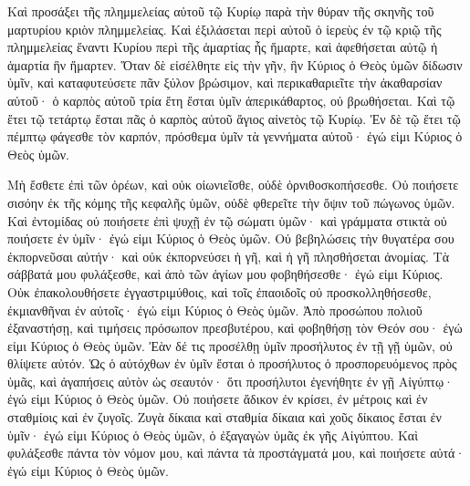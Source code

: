 {Καὶ προσάξει τῆς πλημμελείας αὐτοῦ τῷ Κυρίῳ παρὰ τὴν θύραν τῆς σκηνῆς τοῦ μαρτυρίου κριὸν πλημμελείας.
Καὶ ἐξιλάσεται περὶ αὐτοῦ ὁ ἱερεὺς ἐν τῷ κριῷ τῆς πλημμελείας ἔναντι Κυρίου περὶ τῆς ἁμαρτίας ἧς ἥμαρτε, καὶ ἀφεθήσεται αὐτῷ ἡ ἁμαρτία ἣν ἥμαρτεν.
Ὅταν δὲ εἰσέλθητε εἰς τὴν γῆν, ἣν Κύριος ὁ Θεὸς ὑμῶν δίδωσιν ὑμῖν, καὶ καταφυτεύσετε πᾶν ξύλον βρώσιμον, καὶ περικαθαριεῖτε τὴν ἀκαθαρσίαν αὐτοῦ· ὁ καρπὸς αὐτοῦ τρία ἔτη ἔσται ὑμῖν ἀπερικάθαρτος, οὐ βρωθήσεται.
Καὶ τῷ ἔτει τῷ τετάρτῳ ἔσται πᾶς ὁ καρπὸς αὐτοῦ ἅγιος αἰνετὸς τῷ Κυρίῳ.
Ἐν δὲ τῷ ἔτει τῷ πέμπτῳ φάγεσθε τὸν καρπόν, πρόσθεμα ὑμῖν τὰ γεννήματα αὐτοῦ· ἐγώ εἰμι Κύριος ὁ Θεὸς ὑμῶν.
\par }{\PP {}Μὴ ἔσθετε ἐπὶ τῶν ὀρέων, καὶ οὐκ οἰωνιεῖσθε, οὐδὲ ὀρνιθοσκοπήσεσθε.
Οὐ ποιήσετε σισόην ἐκ τῆς κόμης τῆς κεφαλῆς ὑμῶν, οὐδὲ φθερεῖτε τὴν ὄψιν τοῦ πώγωνος ὑμῶν.
Καὶ ἐντομίδας οὐ ποιήσετε ἐπὶ ψυχῇ ἐν τῷ σώματι ὑμῶν· καὶ γράμματα στικτὰ οὐ ποιήσετε ἐν ὑμῖν· ἐγώ εἰμι Κύριος ὁ Θεὸς ὑμῶν.
Οὐ βεβηλώσεις τὴν θυγατέρα σου ἐκπορνεῦσαι αὐτήν· καὶ οὐκ ἐκπορνεύσει ἡ γῆ, καὶ ἡ γῆ πλησθήσεται ἀνομίας.
Τὰ σάββατά μου φυλάξεσθε, καὶ ἀπὸ τῶν ἁγίων μου φοβηθήσεσθε· ἐγώ εἰμι Κύριος.
Οὐκ ἐπακολουθήσετε ἐγγαστριμύθοις, καὶ τοῖς ἐπαοιδοῖς οὐ προσκολληθήσεσθε, ἐκμιανθῆναι ἐν αὐτοῖς· ἐγώ εἰμι Κύριος ὁ Θεὸς ὑμῶν.
Ἀπὸ προσώπου πολιοῦ ἐξαναστήσῃ, καὶ τιμήσεις πρόσωπον πρεσβυτέρου, καὶ φοβηθήσῃ τὸν Θεόν σου· ἐγώ εἰμι Κύριος ὁ Θεὸς ὑμῶν.
Ἐὰν δέ τις προσέλθῃ ὑμῖν προσήλυτος ἐν τῇ γῇ ὑμῶν, οὐ θλίψετε αὐτόν.
Ὡς ὁ αὐτόχθων ἐν ὑμῖν ἔσται ὁ προσήλυτος ὁ προσπορευόμενος πρὸς ὑμᾶς, καὶ ἀγαπήσεις αὐτὸν ὡς σεαυτόν· ὅτι προσήλυτοι ἐγενήθητε ἐν γῇ Αἰγύπτῳ· ἐγώ εἰμι Κύριος ὁ Θεὸς ὑμῶν.
Οὐ ποιήσετε ἄδικον ἐν κρίσει, ἐν μέτροις καὶ ἐν σταθμίοις καὶ ἐν ζυγοῖς.
Ζυγὰ δίκαια καὶ σταθμία δίκαια καὶ χοῦς δίκαιος ἔσται ἐν ὑμῖν· ἐγώ εἰμι Κύριος ὁ Θεὸς ὑμῶν, ὁ ἐξαγαγὼν ὑμᾶς ἐκ γῆς Αἰγύπτου.
Καὶ φυλάξεσθε πάντα τὸν νόμον μου, καὶ πάντα τὰ προστάγματά μου, καὶ ποιήσετε αὐτά· ἐγώ εἰμι Κύριος ὁ Θεὸς ὑμῶν.

}
